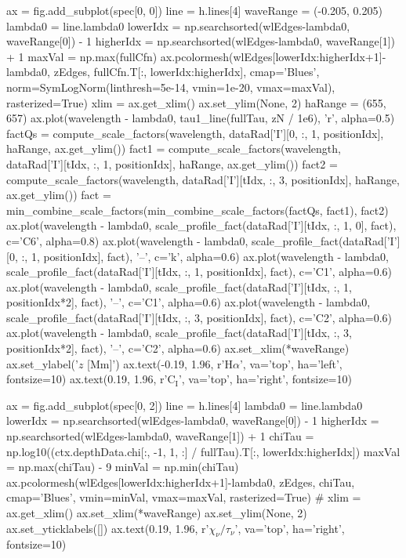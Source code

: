 \begin{pycode}[2DRT]
    ax = fig.add_subplot(spec[0, 0])
    line = h.lines[4]
    waveRange = (-0.205, 0.205)
    lambda0 = line.lambda0
    lowerIdx = np.searchsorted(wlEdges-lambda0, waveRange[0]) - 1
    higherIdx = np.searchsorted(wlEdges-lambda0, waveRange[1]) + 1
    maxVal = np.max(fullCfn)
    ax.pcolormesh(wlEdges[lowerIdx:higherIdx+1]-lambda0, zEdges, fullCfn.T[:, lowerIdx:higherIdx],
                  cmap='Blues', norm=SymLogNorm(linthresh=5e-14, vmin=1e-20, vmax=maxVal), rasterized=True)
    xlim = ax.get_xlim()
    ax.set_ylim(None, 2)
    haRange = (655, 657)
    ax.plot(wavelength - lambda0, tau1_line(fullTau, zN / 1e6), 'r', alpha=0.5)
    factQs = compute_scale_factors(wavelength, dataRad['I'][0, :, 1, positionIdx],
                                   haRange, ax.get_ylim())
    fact1 = compute_scale_factors(wavelength, dataRad['I'][tIdx, :, 1, positionIdx],
                                   haRange, ax.get_ylim())
    fact2 = compute_scale_factors(wavelength, dataRad['I'][tIdx, :, 3, positionIdx],
                                   haRange, ax.get_ylim())
    fact = min_combine_scale_factors(min_combine_scale_factors(factQs, fact1), fact2)
    ax.plot(wavelength - lambda0,
            scale_profile_fact(dataRad['I'][tIdx, :, 1, 0], fact),  c='C6', alpha=0.8)
    ax.plot(wavelength - lambda0,
            scale_profile_fact(dataRad['I'][0, :, 1, positionIdx], fact), '--', c='k', alpha=0.6)
    ax.plot(wavelength - lambda0,
            scale_profile_fact(dataRad['I'][tIdx, :, 1, positionIdx], fact), c='C1', alpha=0.6)
    ax.plot(wavelength - lambda0,
            scale_profile_fact(dataRad['I'][tIdx, :, 1, positionIdx*2], fact), '--', c='C1', alpha=0.6)
    ax.plot(wavelength - lambda0,
            scale_profile_fact(dataRad['I'][tIdx, :, 3, positionIdx], fact), c='C2', alpha=0.6)
    ax.plot(wavelength - lambda0,
            scale_profile_fact(dataRad['I'][tIdx, :, 3, positionIdx*2], fact), '--', c='C2', alpha=0.6)
    ax.set_xlim(*waveRange)
    ax.set_ylabel('$z$ [Mm]')
    ax.text(-0.19, 1.96, r'H$\alpha$', va='top', ha='left', fontsize=10)
    ax.text(0.19, 1.96, r'C$_\mathrm{I}$', va='top', ha='right', fontsize=10)

    ax = fig.add_subplot(spec[0, 2])
    line = h.lines[4]
    lambda0 = line.lambda0
    lowerIdx = np.searchsorted(wlEdges-lambda0, waveRange[0]) - 1
    higherIdx = np.searchsorted(wlEdges-lambda0, waveRange[1]) + 1
    chiTau = np.log10((ctx.depthData.chi[:, -1, 1, :] / fullTau).T[:, lowerIdx:higherIdx])
    maxVal = np.max(chiTau) - 9
    minVal = np.min(chiTau)
    ax.pcolormesh(wlEdges[lowerIdx:higherIdx+1]-lambda0, zEdges,
                  chiTau,
                  cmap='Blues', vmin=minVal, vmax=maxVal, rasterized=True)
    # xlim = ax.get_xlim()
    ax.set_xlim(*waveRange)
    ax.set_ylim(None, 2)
    ax.set_yticklabels([])
    ax.text(0.19, 1.96, r'$\chi_\nu / \tau_\nu$', va='top', ha='right', fontsize=10)


\end{pycode}
